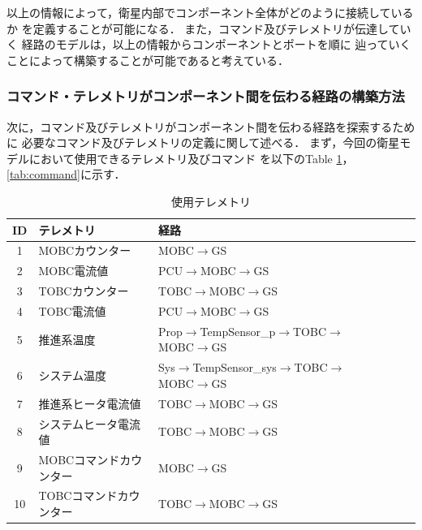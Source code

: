 \documentclass[11pt]{article}
\begin{document}
以上の情報によって，衛星内部でコンポーネント全体がどのように接続しているか
を定義することが可能になる．
また，コマンド及びテレメトリが伝達していく
経路のモデルは，以上の情報からコンポーネントとポートを順に
辿っていくことによって構築することが可能であると考えている．

\subsubsection{コマンド・テレメトリがコンポーネント間を伝わる経路の構築方法}
次に，コマンド及びテレメトリがコンポーネント間を伝わる経路を探索するために
必要なコマンド及びテレメトリの定義に関して述べる．
まず，今回の衛星モデルにおいて使用できるテレメトリ及びコマンド
を以下のTable \ref{tab:telemetry}，\ref{tab:command}に示す．

\begin{table}[H]
   \centering
   \caption{使用テレメトリ}
   \label{tab:telemetry}
      \begin{tabular}{cllcccc} \hline
         ID&テレメトリ&経路\\ \hline
         1&MOBCカウンター&MOBC$\rightarrow$GS\\
         2&MOBC電流値&PCU$\rightarrow$MOBC$\rightarrow$GS\\
         3&TOBCカウンター&TOBC$\rightarrow$MOBC$\rightarrow$GS\\
         4&TOBC電流値&PCU$\rightarrow$MOBC$\rightarrow$GS\\
         5&推進系温度&Prop$\rightarrow$TempSensor\_p$\rightarrow$TOBC$\rightarrow$MOBC$\rightarrow$GS\\
         6&システム温度&Sys$\rightarrow$TempSensor\_sys$\rightarrow$TOBC$\rightarrow$MOBC$\rightarrow$GS\\
         7&推進系ヒータ電流値&TOBC$\rightarrow$MOBC$\rightarrow$GS\\
         8&システムヒータ電流値&TOBC$\rightarrow$MOBC$\rightarrow$GS\\
         9&MOBCコマンドカウンター&MOBC$\rightarrow$GS\\
         10&TOBCコマンドカウンター&TOBC$\rightarrow$MOBC$\rightarrow$GS\\ \hline
      \end{tabular}
\end{table}
\end{document}
